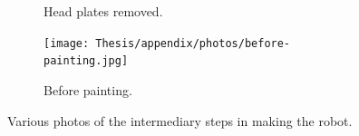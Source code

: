 \begin{figure}[h]
\begin{subfigure}[b]{0.25\linewidth}
        \caption{Head plates removed.}
    \end{subfigure}
    \begin{subfigure}{0.35\linewidth}
        \centering
        \texttt{[image: Thesis/appendix/photos/before-painting.jpg]}
        \caption{Before painting.}
    \end{subfigure}
    \caption{Various photos of the intermediary steps in making the robot.}
    \label{fig:my_label}
\end{figure}
